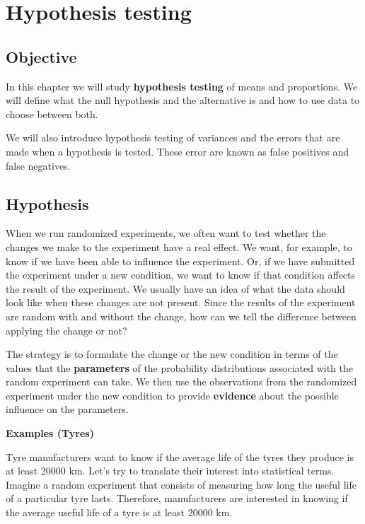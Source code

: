 \documentclass[
]{book}
\begin{document}
\hypertarget{hypothesis-testing}{%
\chapter{Hypothesis testing}\label{hypothesis-testing}}

\hypertarget{objective-9}{%
\section{Objective}\label{objective-9}}

In this chapter we will study \textbf{hypothesis testing} of means and proportions. We will define what the null hypothesis and the alternative is and how to use data to choose between both.

We will also introduce hypothesis testing of variances and the errors that are made when a hypothesis is tested. These error are known as false positives and false negatives.

\hypertarget{hypothesis}{%
\section{Hypothesis}\label{hypothesis}}

When we run randomized experiments, we often want to test whether the changes we make to the experiment have a real effect. We want, for example, to know if we have been able to influence the experiment. Or, if we have submitted the experiment under a new condition, we want to know if that condition affects the result of the experiment. We usually have an idea of what the data should look like when these changes are not present. Since the results of the experiment are random with and without the change, how can we tell the difference between applying the change or not?

The strategy is to formulate the change or the new condition in terms of the values that the \textbf{parameters} of the probability distributions associated with the random experiment can take. We then use the observations from the randomized experiment under the new condition to provide \textbf{evidence} about the possible influence on the parameters.

\textbf{Examples (Tyres)}

Tyre manufacturers want to know if the average life of the tyres they produce is at least 20000 km. Let's try to translate their interest into statistical terms. Imagine a random experiment that consists of measuring how long the useful life of a particular tyre lasts. Therefore, manufacturers are interested in knowing if the average useful life of a tyre is at least 20000 km.
\end{document}
